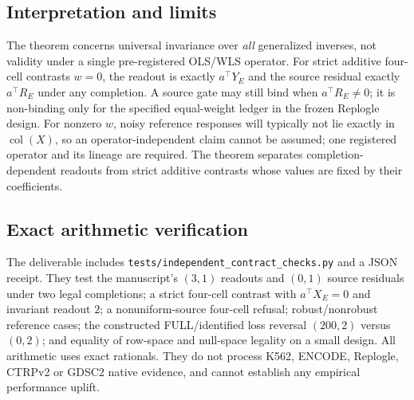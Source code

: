 \documentclass[11pt]{article}
\begin{document}
\subsection{Interpretation and limits}
The theorem concerns universal invariance over \emph{all} generalized inverses, not validity under a single pre-registered OLS/WLS operator. For strict additive four-cell contrasts $w=0$, the readout is exactly $a^\top Y_E$ and the source residual exactly $a^\top R_E$ under any completion. A source gate may still bind when $a^\top R_E\ne0$; it is non-binding only for the specified equal-weight ledger in the frozen Replogle design. For nonzero $w$, noisy reference responses will typically not lie exactly in $\operatorname{col}(X)$, so an operator-independent claim cannot be assumed; one registered operator and its lineage are required. The theorem separates completion-dependent readouts from strict additive contrasts whose values are fixed by their coefficients.

\subsection{Exact arithmetic verification}
The deliverable includes \texttt{tests/independent\_contract\_checks.py} and a JSON receipt. They test the manuscript's $(3,1)$ readouts and $(0,1)$ source residuals under two legal completions; a strict four-cell contrast with $a^\top X_E=0$ and invariant readout $2$; a nonuniform-source four-cell refusal; robust/nonrobust reference cases; the constructed FULL/identified loss reversal $(200,2)$ versus $(0,2)$; and equality of row-space and null-space legality on a small design. All arithmetic uses exact rationals. They do not process K562, ENCODE, Replogle, CTRPv2 or GDSC2 native evidence, and cannot establish any empirical performance uplift.


\medskip
\renewcommand{\refname}{Supplementary references}
\begingroup\small{}


\endgroup
\end{document}
